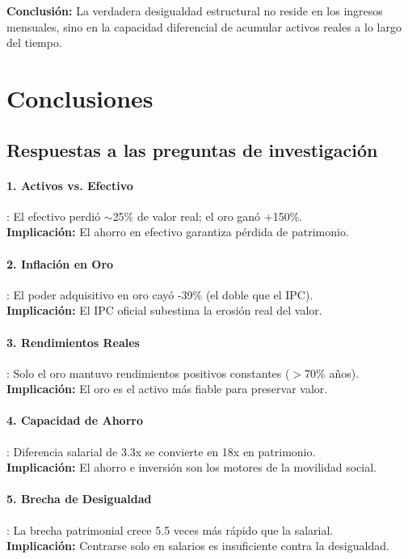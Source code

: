 \documentclass{article}
\begin{document}
\textbf{Conclusi\'on:} La verdadera desigualdad estructural no reside en los ingresos mensuales, sino en la capacidad diferencial de acumular activos reales a lo largo del tiempo.



\section{Conclusiones}

\subsection{Respuestas a las preguntas de investigaci\'on}

\paragraph{1. Activos vs. Efectivo}: El efectivo perdi\'o $\sim$25\% de valor real; el oro gan\'o +150\%.\\
\textbf{Implicaci\'on:} El ahorro en efectivo garantiza p\'erdida de patrimonio.

\paragraph{2. Inflaci\'on en Oro}: El poder adquisitivo en oro cay\'o -39\% (el doble que el IPC).\\
\textbf{Implicaci\'on:} El IPC oficial subestima la erosi\'on real del valor.

\paragraph{3. Rendimientos Reales}: Solo el oro mantuvo rendimientos positivos constantes ($>$70\% a\~nos).\\
\textbf{Implicaci\'on:} El oro es el activo m\'as fiable para preservar valor.

\paragraph{4. Capacidad de Ahorro}: Diferencia salarial de 3.3x se convierte en 18x en patrimonio.\\
\textbf{Implicaci\'on:} El ahorro e inversi\'on son los motores de la movilidad social.

\paragraph{5. Brecha de Desigualdad}: La brecha patrimonial crece 5.5 veces m\'as r\'apido que la salarial.\\
\textbf{Implicaci\'on:} Centrarse solo en salarios es insuficiente contra la desigualdad.
\end{document}
